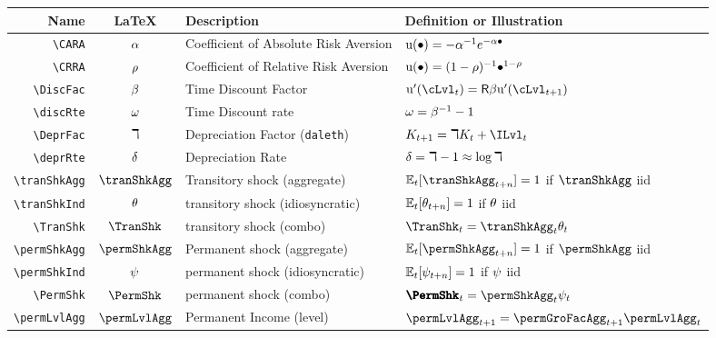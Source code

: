 \documentclass[12pt]{\econtex}
\begin{document}
\hypertarget{Parameters}{}
\begin{table}[ht]
  \centering
  \begin{tabular}{|>{\ttfamily}rcll|} 		
    \hline
    Name    & \LaTeX         & Description & Definition or Illustration
    \\ \hline
    \verb|\CARA|        & $\alpha$       & Coefficient of Absolute Risk Aversion &${\mathrm{u}}(\bullet)=-\alpha^{-1} e^{-\alpha \bullet}$
    \\ \verb|\CRRA|        & $\rho$       & Coefficient of Relative Risk Aversion & ${\mathrm{u}}(\bullet)=(1-\rho)^{-1}\bullet^{1-\rho}$ 
    \\ \verb|\DiscFac|     & $\beta$    & Time Discount Factor & $\uFunc^{\prime}(\cLvl_{t}) =  \Rfree \DiscFac \uFunc^{\prime}(\cLvl_{t+1})$
    \\ \verb|\discRte|     & $\omega$    & Time Discount rate & $\omega=\beta^{-1}-1$
    \\ \verb|\DeprFac|     & $\daleth$    & Depreciation Factor (\texttt{daleth}) & $\Kap_{t+1} = \DeprFac \Kap_{t}+\ILvl_{t}$
    \\ \verb|\deprRte|     & $\delta$    & Depreciation Rate & $\delta = \daleth -1 \approx \log \daleth $
    \\ \verb|\tranShkAgg|  & $\tranShkAgg$ & Transitory shock (aggregate) & $\Ex_{t}[\tranShkAgg_{t+n}]=1$ if $\tranShkAgg$ iid
    \\ \verb|\tranShkInd|  & $\theta$ & transitory shock (idiosyncratic) &  $\mathbb{E}_{t}[\theta_{t+n}]=1$ if $\theta$ iid
    \\ \verb|\TranShk|      & $\TranShk$   & transitory shock (combo) &  $\TranShk_{t} = \tranShkAgg_{t}\tranShkInd_{t}$
    \\ \verb|\permShkAgg|  & $\permShkAgg$ & Permanent shock (aggregate) & $\Ex_{t}[\permShkAgg_{t+n}]=1$ if $\permShkAgg$ iid
    \\ \verb|\permShkInd|  & $\psi$ & permanent shock (idiosyncratic) & $\mathbb{E}_{t}[\psi_{t+n}]=1$ if $\psi$ iid
    \\ \verb|\PermShk|      & $\PermShk$ & permanent shock (combo) & $\pmb{\PermShk}_{t} = \permShkAgg_{t} \permShkInd_{t}$
    \\ \verb|\permLvlAgg|  & $\permLvlAgg$ & Permanent Income (level) & $\permLvlAgg_{t+1} = \permGroFacAgg_{t+1}\permLvlAgg_{t} $

\end{tabular}
\end{table}
\end{document}
